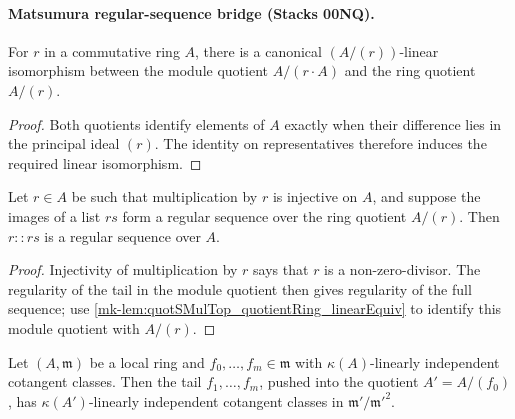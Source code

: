\paragraph{Matsumura regular-sequence bridge (Stacks 00NQ).}

\begin{lemma}\label{mk-lem:quotSMulTop_quotientRing_linearEquiv}
  \leanok

  For \(r\) in a commutative ring \(A\), there is a canonical \((A/(r))\)-linear
  isomorphism between the module quotient \(A/(r \cdot A)\) and the ring quotient
  \(A/(r)\).
\end{lemma}

\begin{proof}
  Both quotients identify elements of \(A\) exactly when their difference
  lies in the principal ideal \((r)\).  The identity on representatives
  therefore induces the required linear isomorphism.
\end{proof}

\begin{lemma}\label{mk-lem:isRegular_cons_of_quotient_ring}
  \leanok

  Let \(r \in A\) be such that multiplication by \(r\) is injective on \(A\), and
  suppose the images of a list \(rs\) form a regular sequence over the ring quotient
  \(A/(r)\). Then \(r :: rs\) is a regular sequence over \(A\).
\end{lemma}

\begin{proof}
  Injectivity of multiplication by \(r\) says that \(r\) is a
  non-zero-divisor.  The regularity of the tail in the module quotient
  then gives regularity of the full sequence; use
  \ref{mk-lem:quotSMulTop_quotientRing_linearEquiv} to identify this module
  quotient with \(A/(r)\).
\end{proof}

\begin{lemma}\label{mk-lem:matsumura_descent_cotangent}
  \leanok

  Let \((A, \mathfrak m)\) be a local ring and \(f_0,\dots,f_m \in \mathfrak m\) with
  \(\kappa(A)\)-linearly independent cotangent classes. Then the tail
  \(f_1,\dots,f_m\), pushed into the quotient \(A' = A/(f_0)\), has
  \(\kappa(A')\)-linearly independent cotangent classes in
  \(\mathfrak m'/\mathfrak m'^2\).
\end{lemma}


